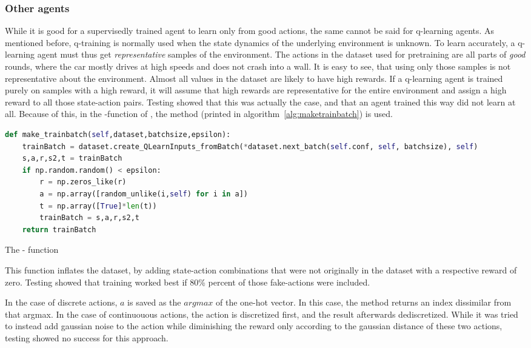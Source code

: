 \subsubsection{Other agents}

While it is good for a supervisedly trained agent to learn only from good actions, the same cannot be said for q-learning agents. As mentioned before, q-training is normally used when the state dynamics of the underlying environment is unknown. To learn accurately, a q-learning agent must thus get \textit{representative} samples of the environment. The actions in the dataset used for pretraining are all parts of \textit{good} rounds, where the car mostly drives at high speeds and does not crash into a wall. It is easy to see, that using only those samples is not representative about the environment. Almost all values in the dataset are likely to have high rewards. If a q-learning agent is trained purely on samples with a high reward, it will assume that high rewards are representative for the entire environment and assign a high reward to all those state-action pairs. Testing showed that this was actually the case, and that an agent trained this way did not learn at all. Because of this, in the -function of , the method  (printed in algorithm~\ref{alg:maketrainbatch}) is used.

\begin{algorithm}[h]
\begin{lstlisting}[language=Python, style=Python, frame=none]
def make_trainbatch(self,dataset,batchsize,epsilon):
	trainBatch = dataset.create_QLearnInputs_fromBatch(*dataset.next_batch(self.conf, self, batchsize), self)
	s,a,r,s2,t = trainBatch
	if np.random.random() < epsilon:
		r = np.zeros_like(r)
		a = np.array([random_unlike(i,self) for i in a])
		t = np.array([True]*len(t))
		trainBatch = s,a,r,s2,t
	return trainBatch
\end{lstlisting}%
\caption{The  - function}
\label{alg:maketrainbatch}
\end{algorithm}

This function inflates the dataset, by adding state-action combinations that were not originally in the dataset with a respective reward of zero. Testing showed that training worked best if 80\% percent of those fake-actions were included.

In the case of discrete actions, $a$ is saved as the $argmax$ of the one-hot vector. In this case, the method  returns an index dissimilar from that argmax. In the case of continuouous actions, the action is discretized first, and the result afterwards dediscretized. While it was tried to instead add gaussian noise to the action while diminishing the reward only according to the gaussian distance of these two actions, testing showed no success for this approach.

